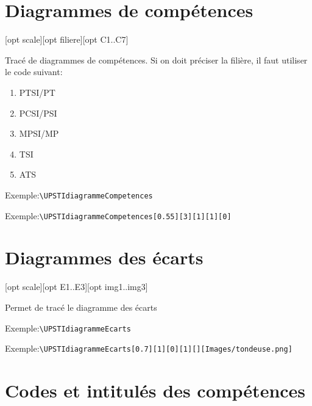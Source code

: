 \documentclass[11pt]{ltxdockit}[2010/09/26]
\newcommand{\ex}{\noindent Exemple:\quad}
\begin{document}
\section{Diagrammes de compétences}
\begin{ltxsyntax}
[opt scale][opt filiere][opt C1..C7]
\end{ltxsyntax}

\noindent Tracé de diagrammes de compétences. Si on doit préciser la filière, il faut utiliser le code suivant:
\begin{enumerate}
\item PTSI/PT
\item PCSI/PSI  
\item MPSI/MP 
\item TSI
\item ATS 
\end{enumerate}

\vspace{1em}
\ex\verb!\UPSTIdiagrammeCompetences!

\vspace{1em}
\UPSTIdiagrammeCompetences

\vspace{1em}
\ex\verb!\UPSTIdiagrammeCompetences[0.55][3][1][1][0]!

\vspace{1em}
\UPSTIdiagrammeCompetences[0.55][3][1][1][0]

\section{Diagrammes des écarts}
\begin{ltxsyntax}
[opt scale][opt E1..E3][opt img1..img3]
\end{ltxsyntax}

\noindent Permet de tracé le \og diagramme des écarts \fg{}

\vspace{1em}
\ex\verb!\UPSTIdiagrammeEcarts!

\vspace{1em}
\UPSTIdiagrammeEcarts

\vspace{1em}
\ex\verb!\UPSTIdiagrammeEcarts[0.7][1][0][1][][Images/tondeuse.png]!

\vspace{1em}

\section{Codes et intitulés des compétences}
\end{document}
